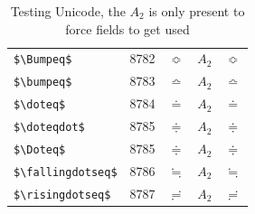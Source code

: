 ﻿\documentclass{article}
\begin{document}
\begin{table}
\begin{center}
\begin{tabular}{llll}
 \verb#$\Bumpeq$#         & 8782    & $\Bumpeq$         & $A_2\quad \Bumpeq$\\
 \verb#$\bumpeq$#         & 8783    & $\bumpeq$         & $A_2\quad \bumpeq$\\
 \verb#$\doteq$#          & 8784    & $\doteq$          & $A_2\quad \doteq$\\
 \verb#$\doteqdot$#       & 8785    & $\doteqdot$       & $A_2\quad \doteqdot$\\
 \verb#$\Doteq$#          & 8785    & $\Doteq$          & $A_2\quad \Doteq$\\
 \verb#$\fallingdotseq$#  & 8786    & $\fallingdotseq$  & $A_2\quad \fallingdotseq$\\
 \verb#$\risingdotseq$#   & 8787    & $\risingdotseq$   & $A_2\quad \risingdotseq$\\
\end{tabular}
\end{center}
\caption{Testing Unicode, the $A_2$ is only present to force fields to get used}
\end{table}
\clearpage
\end{document}
